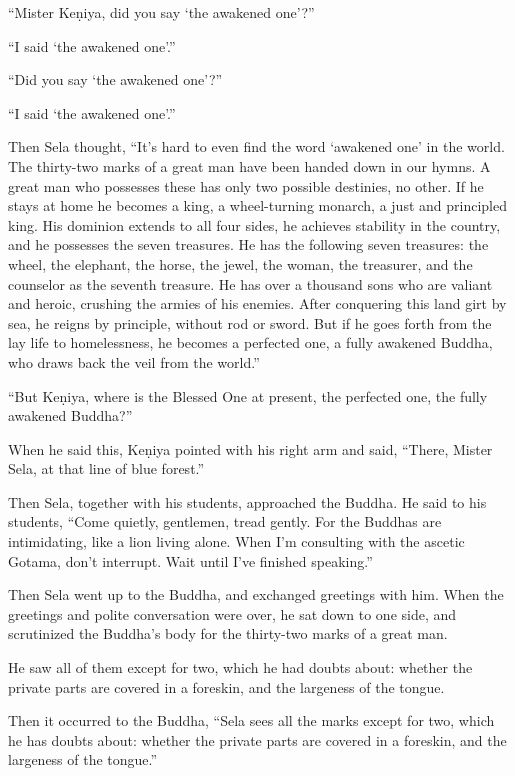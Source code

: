 \documentclass[12pt,openany]{book}%
\begin{document}
“Mister \textsanskrit{Keṇiya}, did you say ‘the awakened one’?” 

“I said ‘the awakened one’.” 

“Did you say ‘the awakened one’?” 

“I said ‘the awakened one’.” 

Then Sela thought, “It’s hard to even find the word ‘awakened one’ in the world. The thirty-two marks of a great man have been handed down in our hymns. A great man who possesses these has only two possible destinies, no other. If he stays at home he becomes a king, a wheel-turning monarch, a just and principled king. His dominion extends to all four sides, he achieves stability in the country, and he possesses the seven treasures. He has the following seven treasures: the wheel, the elephant, the horse, the jewel, the woman, the treasurer, and the counselor as the seventh treasure. He has over a thousand sons who are valiant and heroic, crushing the armies of his enemies. After conquering this land girt by sea, he reigns by principle, without rod or sword. But if he goes forth from the lay life to homelessness, he becomes a perfected one, a fully awakened Buddha, who draws back the veil from the world.” 

“But \textsanskrit{Keṇiya}, where is the Blessed One at present, the perfected one, the fully awakened Buddha?” 

When he said this, \textsanskrit{Keṇiya} pointed with his right arm and said, “There, Mister Sela, at that line of blue forest.” 

Then Sela, together with his students, approached the Buddha. He said to his students, “Come quietly, gentlemen, tread gently. For the Buddhas are intimidating, like a lion living alone. When I’m consulting with the ascetic Gotama, don’t interrupt. Wait until I’ve finished speaking.” 

Then Sela went up to the Buddha, and exchanged greetings with him. When the greetings and polite conversation were over, he sat down to one side, and scrutinized the Buddha’s body for the thirty-two marks of a great man. 

He saw all of them except for two, which he had doubts about: whether the private parts are covered in a foreskin, and the largeness of the tongue. 

Then it occurred to the Buddha, “Sela sees all the marks except for two, which he has doubts about: whether the private parts are covered in a foreskin, and the largeness of the tongue.” 
\end{document}
